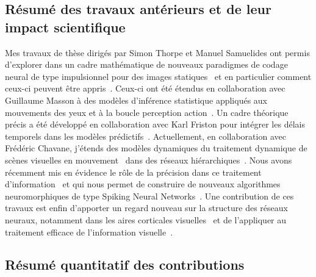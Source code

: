 \documentclass[10pt,french,a4paper,oneside]{article}%
\begin{document}
\subsection*{Résumé des travaux antérieurs et de leur impact scientifique}
Mes travaux de thèse dirigés par Simon Thorpe et Manuel Samuelides ont permis d'explorer dans un cadre mathématique de nouveaux paradigmes de codage neural de type impulsionnel pour des images statiques~\citep{Perrinet03ieee} et en particulier comment ceux-ci peuvent être appris~\citep{Perrinet10shl}. Ceux-ci ont été étendus en collaboration avec Guillaume Masson à des modèles d'inférence statistique appliqués aux mouvements des yeux et à la boucle perception action~\citep{Simoncini12}. Un cadre théorique précis a été développé en collaboration avec Karl Friston pour intégrer les délais temporels dans les modèles prédictifs~\citep{PerrinetAdamsFriston14}. Actuellement, en collaboration avec Frédéric Chavane, j'étends des modèles dynamiques du traitement dynamique de scènes visuelles en mouvement~\citep{KhoeiMassonPerrinet17} dans des réseaux hiérarchiques~\citep{BoutinFranciosiniChavaneRuffierPerrinet20,Franciosini21}. Nous avons récemment mis en évidence le rôle de la précision dans ce traitement d'information~\citep{Ladret23} et qui nous permet de construire de nouveaux algorithmes neuromorphiques de type Spiking Neural Networks~\citep{Grimaldi24}. Une contribution de ces travaux est enfin d'apporter un regard nouveau sur la structure des réseaux neuraux, notamment dans les aires corticales visuelles~\citep{Chavane22} et de l'appliquer au traitement efficace de l'information visuelle~\citep{Jeremie25}.

\subsection*{Résumé quantitatif des contributions}
\end{document}
